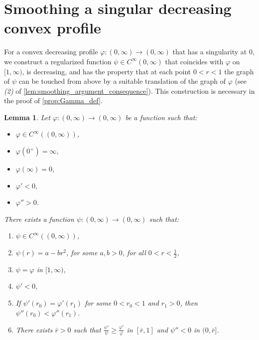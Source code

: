 \documentclass[10pt, reqno]{amsart}
\newcounter{results}[section] %
\theoremstyle{plain}
\newtheorem{lemma}[results]{Lemma}
\theoremstyle{remark}
\theoremstyle{definition}
\numberwithin{equation}{section}
\theoremstyle{plain}
\begin{document}
\appendix
\section{Smoothing a singular decreasing convex profile}
\label{sec:smoothing}

For a convex decreasing profile $\varphi:(0,\infty)\to(0,\infty)$ that has a singularity at $0$, we construct a regularized function $\psi\in C^\infty(0,\infty)$ that coincides with $\varphi$ on $[1,\infty)$, is decreasing, and has the property that at each point $0<r<1$ the graph of $\psi$ can be touched from above by a suitable translation of the graph of $\varphi$ (see \textit{(2)} of \cref{lem:smoothing_argument_consequence}).
This construction is necessary in the proof of \cref{prop:Gamma_def}.

\begin{lemma}\label{lem:crucial_smoothing_argument}
    Let $\varphi:(0,\infty)\to(0,\infty)$ be a function such that:
    \begin{itemize}
        \item $\varphi\in C^\infty((0,\infty))$,
        \item $\varphi(0^+) = \infty$,
        \item $\varphi(\infty) = 0$,
        \item $\varphi' < 0$,
        \item $\varphi'' > 0$.
    \end{itemize}
    There exists a function $\psi:(0,\infty)\to(0,\infty)$ such that:
    \begin{enumerate}
        \item $\psi\in C^\infty((0,\infty))$,
        \item $\psi(r)=a-br^2$, for some $a,b>0$, for all $0<r<\frac12$,
        \item $\psi = \varphi$ in $[1,\infty)$,
        \item $\psi'<0$,
        \item If $\psi'(r_0)=\varphi'(r_1)$ for some $0 < r_0 < 1$ and $r_1>0$, then $\psi''(r_0) < \varphi''(r_1)$.
        \item There exists $\bar r>0$ such that $\frac{\psi'}{\psi}\ge \frac{\varphi'}{\varphi}$ in $[\bar r, 1]$ and $\psi''<0$ in $(0, \bar r]$.
    \end{enumerate}
\end{lemma}
\end{document}
